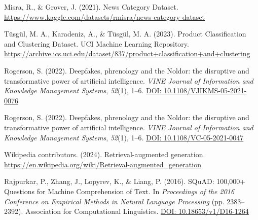 \documentclass{article}
\begin{document}
\begin{thebibliography}{99}
Misra, R., \& Grover, J. (2021).
News Category Dataset.
\url{https://www.kaggle.com/datasets/rmisra/news-category-dataset}

Tüsgül, M. A., Karadeniz, A., \& Tüsgül, M. A. (2023).
Product Classification and Clustering Dataset.
UCI Machine Learning Repository.
\url{https://archive.ics.uci.edu/dataset/837/product+classification+and+clustering}

Rogerson, S. (2022).
Deepfakes, phrenology and the Noldor: the disruptive and transformative power of artificial intelligence.
\textit{VINE Journal of Information and Knowledge Management Systems}, \textit{52}(1), 1--6.
\href{https://doi.org/10.1108/VJIKMS-05-2021-0076}{DOI: 10.1108/VJIKMS-05-2021-0076}

Rogerson, S. (2022).
Deepfakes, phrenology and the Noldor: the disruptive and transformative power of artificial intelligence.
\textit{VINE Journal of Information and Knowledge Management Systems}, \textit{52}(1), 1--6.
\href{https://doi.org/10.1108/VC-05-2021-0047}{DOI: 10.1108/VC-05-2021-0047}

Wikipedia contributors. (2024).
Retrieval-augmented generation.
\url{https://en.wikipedia.org/wiki/Retrieval-augmented_generation}

Rajpurkar, P., Zhang, J., Lopyrev, K., \& Liang, P. (2016).
{SQuAD}: 100,000+ Questions for Machine Comprehension of Text.
In \textit{Proceedings of the 2016 Conference on Empirical Methods in Natural Language Processing} (pp. 2383--2392). Association for Computational Linguistics.
\href{https://doi.org/10.18653/v1/D16-1264}{DOI: 10.18653/v1/D16-1264}

\end{thebibliography}
\end{document}
